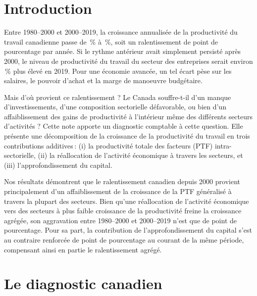\documentclass[11pt, letterpaper]{article}
\begin{document}
\vspace{6pt}


\section{Introduction}
\label{sec:introduction}

Entre 1980--2000 et 2000--2019, la croissance annualisée de la productivité du travail canadienne passe de \LPGrowthMid\,\% à \LPGrowthLate\,\%, soit un ralentissement de \LPSlowdownMidLate{} point de pourcentage par année. Si le rythme antérieur avait simplement persisté après 2000, le niveau de productivité du travail du secteur des entreprises serait environ \CounterfactualProductivityGapLate\,\% plus élevé en 2019. Pour une économie avancée, un tel écart pèse sur les salaires, le pouvoir d'achat et la marge de manoeuvre budgétaire.

Mais d'où provient ce ralentissement ? Le Canada souffre-t-il d'un manque d'investissements, d'une composition sectorielle défavorable, ou bien d'un affaiblissement des gains de productivité à l'intérieur même des différents secteurs d'activités ? Cette note apporte un diagnostic comptable à cette question. Elle présente une décomposition de la croissance de la productivité du travail en trois contributions additives\,: (i) la productivité totale des facteurs (PTF) intra-sectorielle, (ii) la réallocation de l'activité économique à travers les secteurs, et (iii) l'approfondissement du capital.

Nos résultats démontrent que le ralentissement canadien depuis 2000 provient principalement d'un affaiblissement de la croissance de la PTF généralisé à travers la plupart des secteurs. Bien qu'une réallocation de l'activité économique vers des secteurs à plus faible croissance de la productivité freine la croissance agrégée, son aggravation entre 1980--2000 et 2000--2019 n'est que de \ReallocationWorseningMidLate{} point de pourcentage. Pour sa part, la contribution de l'approfondissement du capital s'est au contraire renforcée de \CapitalOffsetMidLate{} point de pourcentage au courant de la même période, compensant ainsi en partie le ralentissement agrégé.


\section{Le diagnostic canadien}
\end{document}
